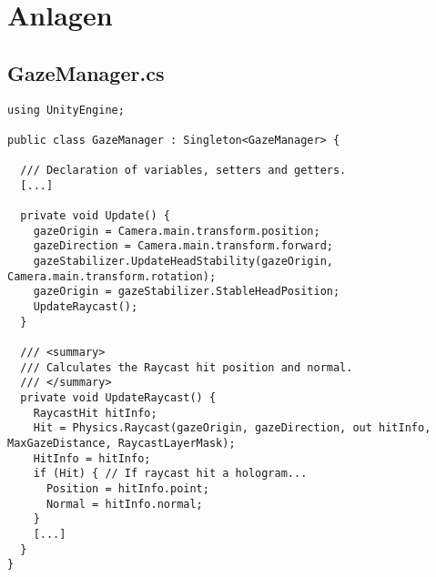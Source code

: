 \appendix
\chapter{Anlagen}

\section{GazeManager.cs}
\begin{lstlisting}[caption=GazeManager.cs, label=code:GazeManager]
using UnityEngine;

public class GazeManager : Singleton<GazeManager> {

  /// Declaration of variables, setters and getters.
  [...]

  private void Update() {
	gazeOrigin = Camera.main.transform.position;
	gazeDirection = Camera.main.transform.forward;
	gazeStabilizer.UpdateHeadStability(gazeOrigin, Camera.main.transform.rotation);
	gazeOrigin = gazeStabilizer.StableHeadPosition;
	UpdateRaycast();
  }

  /// <summary>
  /// Calculates the Raycast hit position and normal.
  /// </summary>         
  private void UpdateRaycast() {
	RaycastHit hitInfo;
	Hit = Physics.Raycast(gazeOrigin, gazeDirection, out hitInfo, MaxGazeDistance, RaycastLayerMask);
	HitInfo = hitInfo;
	if (Hit) { // If raycast hit a hologram...
	  Position = hitInfo.point;
	  Normal = hitInfo.normal;
	}
	[...]
  }
}
\end{lstlisting}

